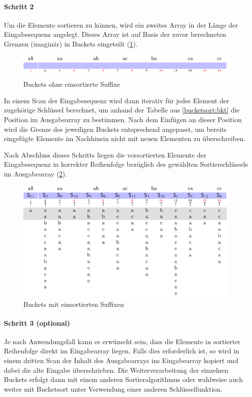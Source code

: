 \paragraph{Schritt 2}
Um die Elemente sortieren zu können, wird ein zweites Array in der Länge der Eingabesequenz angelegt. Dieses Array ist auf Basis der zuvor berechneten Grenzen (imaginär) in Buckets eingeteilt (\cref{bucketsort:empty_buckets}).
\begin{figure}[ht]
    \includegraphics[width=\textwidth]{kapitel/komponenten/sortieralgorithmen/bucketsort/step_02/empty_buckets/image.pdf}
    \caption{Buckets ohne einsortierte Suffixe}
    \label{bucketsort:empty_buckets}
\end{figure}
In einem Scan der Eingabesequenz wird dann iterativ für jedes Element der zugehörige Schlüssel berechnet, um anhand der Tabelle aus \cref{bucketsort:bkt} die Position im Ausgabearray zu bestimmen. Nach dem Einfügen an dieser Position wird die Grenze des jeweiligen Buckets entsprechend angepasst, um bereits eingefügte Elemente im Nachhinein nicht mit neuen Elementen zu überschreiben.\par
Nach Abschluss dieses Schritts liegen die vorsortierten Elemente der Eingabesequenz in korrekter Reihenfolge bezüglich des gewählten Sortierschlüssels im Ausgabearray (\cref{bucketsort:buckets}).
\begin{figure}[ht]
    \includegraphics[width=\textwidth]{kapitel/komponenten/sortieralgorithmen/bucketsort/step_02/buckets/image.pdf}
    \caption{Buckets mit einsortierten Suffixen}
    \label{bucketsort:buckets}
\end{figure}
\paragraph{Schritt 3 (optional)}
Je nach Anwendungsfall kann es erwünscht sein, dass die Elemente in sortierter Reihenfolge direkt im Eingabearray liegen. Falls dies erforderlich ist, so wird in einem dritten Scan der Inhalt des Ausgabearrays ins Eingabearray kopiert und dabei die alte Eingabe überschrieben. Die Weiterverarbeitung der einzelnen Buckets erfolgt dann mit einem anderen Sortieralgorithmus oder wahlweise auch weiter mit Bucketsort unter Verwendung einer anderen Schlüsselfunktion.
